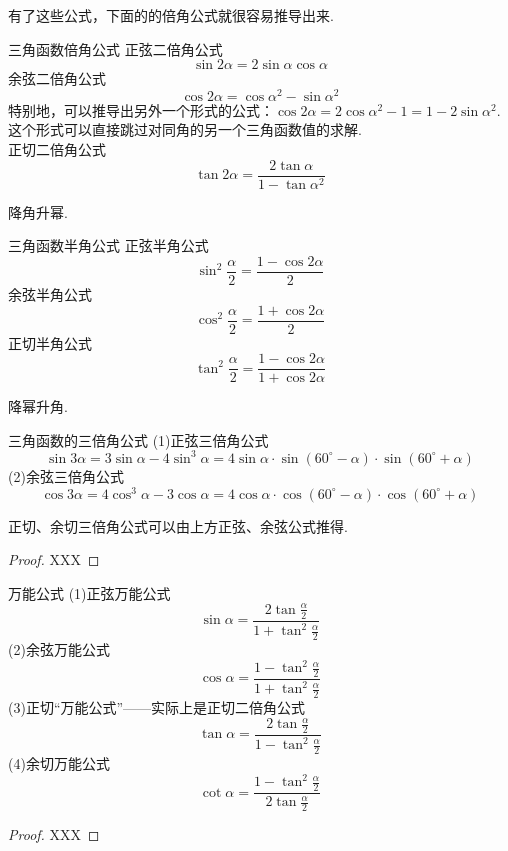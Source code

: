 \documentclass[lang=cn, zihao=5]{elegantbook}
\begin{document}
有了这些公式，下面的的倍角公式就很容易推导出来.

\begin{proposition}{三角函数倍角公式} %
    正弦二倍角公式$$\sin{2\alpha}=2\sin{\alpha}\cos{\alpha}$$
    余弦二倍角公式$$\cos{2\alpha}=\cos{\alpha ^2}-\sin{\alpha ^2}$$
    特别地，可以推导出另外一个形式的公式：$\cos{2\alpha}=2\cos{\alpha ^2}-1=1-2\sin{\alpha ^2}$.这个形式可以直接跳过对同角的另一个三角函数值的求解.\\
    正切二倍角公式$$\tan{2\alpha}=\frac{2\tan{\alpha}}{1-\tan{\alpha ^2}}$$
\end{proposition}

降角升幂.

\begin{proposition}{三角函数半角公式} %
    正弦半角公式$$\sin ^2 \frac{\alpha}{2}=\frac{1-\cos{2\alpha}}{2}$$
    余弦半角公式$$\cos ^2 \frac{\alpha}{2}=\frac{1+\cos{2\alpha}}{2}$$
    正切半角公式$$\tan ^2 \frac{\alpha}{2}=\frac{1-\cos{2\alpha}}{1+\cos{2\alpha}}$$
\end{proposition}

降幂升角.

\begin{proposition}{三角函数的三倍角公式} %
    (1)正弦三倍角公式$$\sin{3\alpha}=3\sin{\alpha}-4\sin^3 \alpha=4\sin{\alpha} \cdot \sin{(60^{\circ}-\alpha)} \cdot \sin{(60^{\circ}+\alpha)}$$
    (2)余弦三倍角公式$$\cos{3\alpha}=4\cos^3 \alpha-3\cos{\alpha}=4\cos{\alpha} \cdot \cos{(60^{\circ}-\alpha)} \cdot \cos{(60^{\circ}+\alpha)}$$
\end{proposition}
\begin{remark}
    正切、余切三倍角公式可以由上方正弦、余弦公式推得.
\end{remark}
\begin{proof}
    XXX
\end{proof}

\begin{proposition}{万能公式} %
    (1)正弦万能公式$$\sin{\alpha}=\frac{2\tan{\frac{\alpha}{2}}}{1+\tan^2{\frac{\alpha}{2}}}$$
    (2)余弦万能公式$$\cos{\alpha}=\frac{1-\tan^2{\frac{\alpha}{2}}}{1+\tan^2{\frac{\alpha}{2}}}$$
    (3)正切“万能公式”——实际上是正切二倍角公式$$\tan{\alpha}=\frac{2\tan{\frac{\alpha}{2}}}{1-\tan^2{\frac{\alpha}{2}}}$$
    (4)余切万能公式$$\cot{\alpha}=\frac{1-\tan^2{\frac{\alpha}{2}}}{2\tan{\frac{\alpha}{2}}}$$
\end{proposition}
\begin{proof}
    XXX
\end{proof}
\end{document}
